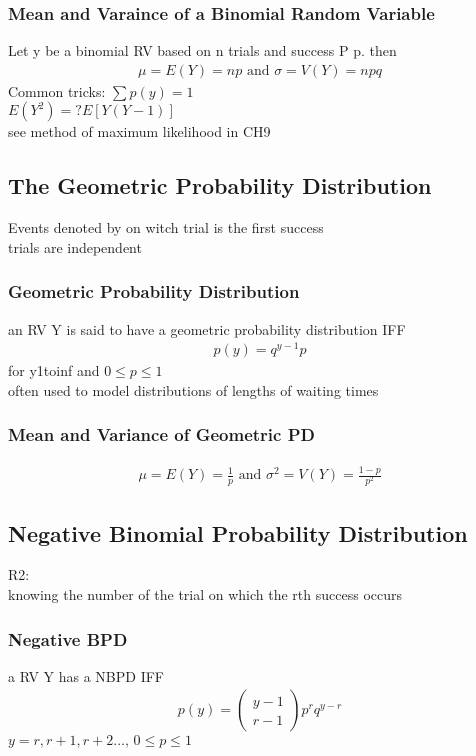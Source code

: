 \documentclass[12pt]{article}
\begin{document}
    \subsubsection{Mean and Varaince of a Binomial Random Variable}
        Let y be a binomial RV based on n trials and success P p. then
        \begin{align*}
            \mu = E(Y) = np\text{ and } \sigma = V(Y) = npq
        \end{align*}
        Common tricks: $ \sum p(y) = 1 $ \\
        $ E(Y^2) =? E[Y(Y-1)] $\\
        see method of maximum likelihood in CH9
\subsection{The Geometric Probability Distribution}
    Events denoted by on witch trial is the first success\\
    trials are independent
    \subsubsection{Geometric Probability Distribution}
        an RV Y is said to have a geometric probability distribution IFF
        \begin{align*}
            p(y) = q^{y-1}p
        \end{align*}
        for y1toinf and $ 0 \le p \le 1 $ \\
        often used to model distributions of lengths of waiting times
    \subsubsection{Mean and Variance of Geometric PD}
        \begin{align*}
            \mu = E(Y) = \frac{1}{p} \text{ and } \sigma ^2 = V(Y) = 
            \frac{1-p}{p^2}
        \end{align*}
\subsection{Negative Binomial Probability Distribution }
    R2:\\
    knowing the number of the trial on which the rth 
    success occurs
    \subsubsection{Negative BPD}
        a RV Y has a NBPD IFF
        \begin{align*}
            p(y) = \begin{pmatrix}y-1\\r-1\end{pmatrix}p^rq^{y-r}
        \end{align*}
        $ y = r, r+ 1,r+ 2...,\,0 \le p \le 1 $
\end{document}
